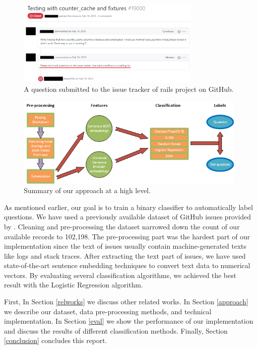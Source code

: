 \documentclass[conference]{IEEEtran}
\begin{document}
\begin{figure}[t]
  \centerline{\includegraphics[width=3.5in]{./figures/q-issue.png}}
  \caption{A question submitted to the issue tracker of rails project on GitHub.}
  \label{fig:qissue}
\end{figure}

\begin{figure}[t]
  \centerline{\includegraphics{./figures/process.png}}
  \caption{Summary of our approach at a high level.}
  \label{fig:process}
\end{figure}

As mentioned earlier, our goal is to train a binary classifier to automatically label questions.
We have used a previously available dataset of GitHub issues provided by \cite{8816794}.
Cleaning and pre-processing the dataset narrowed down the count of our available 
records to 102,198. The pre-processing part was the hardest part of our implementation
since the text of issues usually contain machine-generated texts like logs and stack traces. 
After extracting the text part of issues, we have used state-of-the-art sentence embedding techniques
to convert text data to numerical vectors. By evaluating several classification 
algorithms, we achieved the best result with the Logistic Regression algorithm.

First, In Section \ref{relworks} we discuss other related works. 
In Section \ref{approach} we describe our dataset, data pre-processing methods, 
and technical implementation. In Section \ref{eval} we show the performance of our implementation
and discuss the results of different classification methods.
Finally, Section \ref{conclusion} concludes this report.
\end{document}
